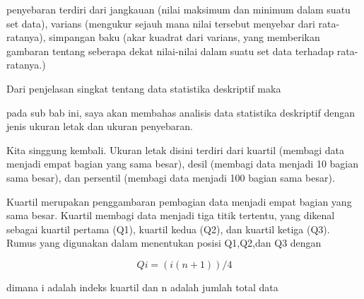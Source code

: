 \documentclass[a4paper,10pt]{article}
\begin{document}
\begin{eulernotebook}
\begin{eulercomment}
penyebaran terdiri dari jangkauan (nilai maksimum dan minimum dalam
suatu set data), varians (mengukur sejauh mana nilai tersebut menyebar
dari rata-ratanya), simpangan baku (akar kuadrat dari varians, yang
memberikan gambaran tentang seberapa dekat nilai-nilai dalam suatu set
data terhadap rata-ratanya.)\\
\end{eulercomment}
\begin{eulerttcomment}
   Dari penjelasan singkat tentang data statistika deskriptif maka
\end{eulerttcomment}
\begin{eulercomment}
pada sub bab ini, saya akan membahas analisis data statistika
deskriptif dengan jenis ukuran letak dan ukuran penyebaran.
\end{eulercomment}
\begin{eulercomment}
Kita singgung kembali. Ukuran letak disini terdiri dari kuartil
(membagi data menjadi empat bagian yang sama besar), desil (membagi
data menjadi 10 bagian sama besar), dan persentil (membagi data
menjadi 100 bagian sama besar).

\begin{eulercomment}
\begin{eulercomment}
Kuartil merupakan penggambaran pembagian data menjadi empat bagian
yang sama besar. Kuartil membagi data menjadi tiga titik tertentu,
yang dikenal sebagai kuartil pertama (Q1), kuartil kedua (Q2), dan
kuartil ketiga (Q3). Rumus yang digunakan dalam menentukan posisi
Q1,Q2,dan Q3 dengan\\
\end{eulercomment}
\begin{eulerformula}
\[
Qi = (i(n+1))/4
\]
\end{eulerformula}
\begin{eulercomment}
dimana i adalah indeks kuartil dan n adalah jumlah total data


\end{eulercomment}
\end{eulercomment}
\end{eulercomment}
\end{eulernotebook}
\end{document}
